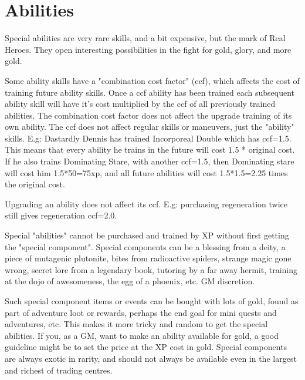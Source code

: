 \closeskillslist















\section*{Abilities}

Special abilities are very rare skills, and a bit expensive, but the mark of Real Heroes. They open interesting possibilities in the fight for gold, glory, and more gold.

Some ability skills have a "combination cost factor" (ccf), which affects the cost of training future ability skills. Once a ccf ability has been trained each subsequent ability skill will have it's cost multiplied by the ccf of all previously trained abilities. The combination cost factor does not affect the upgrade training of its own ability. The ccf does not affect regular skills or maneuvers, just the "ability" skills. 
E.g: Dastardly Dennis has trained Incorporeal Double which has ccf=1.5. This means that every ability he trains in the future will cost 1.5 * original cost. If he also trains Dominating Stare, with another ccf=1.5, then Dominating stare will cost him 1.5*50=75xp, and all future abilities will cost 1.5*1.5=2.25 times the original cost.

Upgrading an ability does not affect its ccf. E.g: purchasing regeneration twice still gives regeneration ccf=2.0.

Special "abilities" cannot be purchased and trained by XP without first getting the "special component". Special components can be a blessing from a deity, a piece of mutagenic plutonite, bites from radioactive spiders, strange magic gone wrong, secret lore from a legendary book, tutoring by a far away hermit, training at the dojo of awesomeness, the egg of a phoenix, etc. GM discretion.

Such special component items or events can be bought with lots of gold, found as part of adventure loot or rewards, perhaps the end goal for mini quests and adventures, etc. This makes it more tricky and random to get the special abilities. If you, as a GM, want to make an ability available for gold, a good guideline might be to set the price at the XP cost in gold. Special components are always exotic in rarity, and should not always be available even in the largest and richest of trading centres.

